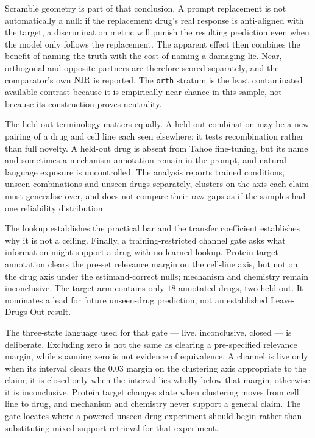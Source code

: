 Scramble geometry is part of that conclusion. A prompt replacement is not automatically a null: if
the replacement drug's real response is anti-aligned with the target, a discrimination metric will
punish the resulting prediction even when the model only follows the replacement. The apparent
effect then combines the benefit of naming the truth with the cost of naming a damaging lie. Near,
orthogonal and opposite partners are therefore scored separately, and the comparator's own $\textrm{NIR}$
is reported. The \texttt{orth} stratum is the least contaminated available contrast because it is
empirically near chance in this sample, not because its construction proves neutrality.

The held-out terminology matters equally. A held-out combination may be a new pairing of a drug and
cell line each seen elsewhere; it tests recombination rather than full novelty. A held-out drug is
absent from Tahoe fine-tuning, but its name and sometimes a mechanism annotation remain in the
prompt, and natural-language exposure is uncontrolled. The analysis reports trained conditions,
unseen combinations and unseen drugs separately, clusters on the axis each claim must generalise
over, and does not compare their raw gaps as if the samples had one reliability distribution.

The lookup establishes the practical bar and the transfer coefficient establishes why it is not a
ceiling. Finally, a training-restricted channel gate asks what information might support a drug with
no learned lookup. Protein-target annotation clears the pre-set relevance margin on the cell-line
axis, but not on the drug axis under the estimand-correct nulls; mechanism and chemistry remain
inconclusive. The target arm contains only $18$ annotated drugs, two held out. It nominates a lead
for future unseen-drug prediction, not an established Leave-Drugs-Out result.

The three-state language used for that gate --- live, inconclusive, closed --- is deliberate.
Excluding zero is not the same as clearing a pre-specified relevance margin, while spanning zero is
not evidence of equivalence. A channel is live only when its interval clears the $0.03$ margin on
the clustering axis appropriate to the claim; it is closed only when the interval lies wholly below
that margin; otherwise it is inconclusive. Protein target changes state when clustering moves from
cell line to drug, and mechanism and chemistry never support a general claim. The gate locates where
a powered unseen-drug experiment should begin rather than substituting mixed-support retrieval for
that experiment.

